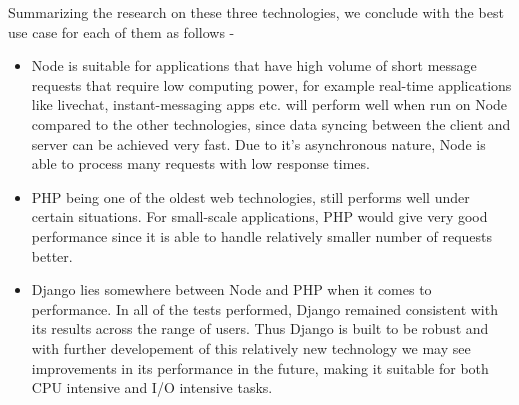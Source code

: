 \documentclass[../thesis.tex]{subfiles}
\begin{document}
Summarizing the research on these three technologies, we conclude with the best use case for each of them as follows -
\begin{itemize}
	\item  Node is suitable for applications that have high volume of short message requests that require low computing power, for example real-time applications like livechat, instant-messaging apps etc. will perform well when run on Node compared to the other technologies, since data syncing between the client and server can be achieved very fast. Due to it's asynchronous nature, Node is able to process many requests with low response times.
	\item PHP being one of the oldest web technologies, still performs well under certain situations. For small-scale applications, PHP would give very good performance since it is able to handle relatively smaller number of requests better.
	\item Django lies somewhere between Node and PHP when it comes to performance. In all of the tests performed, Django remained consistent with its results across the range of users. Thus Django is built to be robust and with further developement of this relatively new technology we may see improvements in its performance in the future, making it suitable for both CPU intensive and I/O intensive tasks.
\end{itemize}
\end{document}

